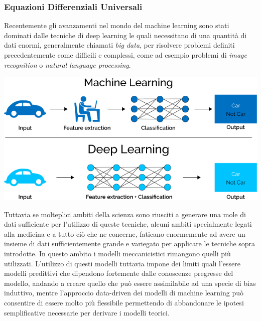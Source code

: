 \subsubsection*{Equazioni Differenziali Universali}
Recentemente gli avanzamenti nel mondo del machine learning sono stati dominati dalle tecniche 
di deep learning le quali necessitano di una quantità di dati enormi, generalmente chiamati \emph{big data}, 
per risolvere problemi definiti precedentemente come difficili e complessi, come ad esempio problemi di 
\emph{image recognition} o \emph{natural language processing}. 

\begin{minipage}{\linewidth}
    \centering
    \includegraphics[width=\textwidth]{img/Caratteristiche-e-funzionamento-del-Deep-Learning-in-informatica.png}
    \label{fig:ml_dl_example}
\end{minipage}

Tuttavia se molteplici ambiti della scienza sono riusciti a generare una mole di dati sufficiente per l'utilizzo di 
queste tecniche, alcuni ambiti specialmente legati alla medicina e a tutto ciò che ne concerne, faticano enormemente
ad avere un insieme di dati sufficientemente grande e variegato per applicare le tecniche sopra introdotte. In questo 
ambito i modelli meccanicistici rimangono quelli più utilizzati. L'utilizzo di questi modelli tuttavia impone dei limiti 
quali l'essere modelli predittivi che dipendono fortemente dalle conoscenze pregresse del modello, andando a creare quello 
che può essere assimilabile ad una specie di bias induttivo, mentre l'approccio data-driven dei modelli di machine learning 
può consentire di essere molto più flessibile permettendo di abbandonare le ipotesi semplificative 
necessarie per derivare i modelli teorici. 


